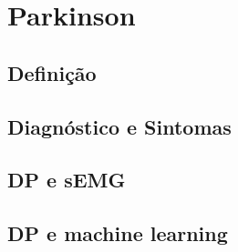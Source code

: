 \chapter{Parkinson}

\section{Definição}
\section{Diagnóstico e Sintomas}
\section{DP e sEMG}
\section{DP e machine learning}
